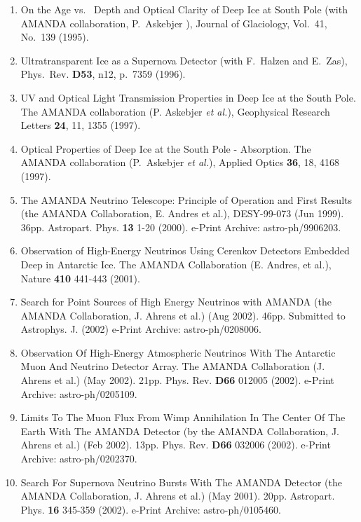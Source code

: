\begin{enumerate}
\item    On the Age vs.~ Depth and Optical Clarity of Deep Ice at 
         South Pole
         (with AMANDA collaboration, P.~Askebjer \etal),
         Journal of Glaciology, Vol.~41, No.~139 (1995).

\item    Ultratransparent Ice as a Supernova Detector
         (with F.~Halzen and E.~Zas), Phys.~Rev. {\bf D53}, n12, p.~7359
         (1996).

\item    UV and Optical Light Transmission Properties in Deep Ice at the
         South Pole.
         The AMANDA collaboration (P. Askebjer {\sl et al.}),
         Geophysical Research Letters {\bf 24}, 11, 1355 (1997).

\item    Optical Properties of Deep Ice at the South Pole - Absorption.
         The AMANDA collaboration (P.~Askebjer {\sl et al.}), 
         Applied Optics {\bf 36}, 18, 4168 (1997).

\item The AMANDA Neutrino Telescope: Principle of Operation and First Results (the AMANDA Collaboration, E. Andres et al.), DESY-99-073 (Jun 1999). 36pp. Astropart. Phys. {\bf 13} 1-20 (2000).  e-Print Archive: astro-ph/9906203.


\item Observation of High-Energy Neutrinos Using Cerenkov Detectors Embedded Deep in Antarctic Ice.  The AMANDA Collaboration (E. Andres, et al.), Nature {\bf 410} 441-443 (2001).

\item Search for Point Sources of High Energy Neutrinos with AMANDA (the AMANDA Collaboration, J. Ahrens et al.) (Aug 2002). 46pp. Submitted to Astrophys. J. (2002) e-Print Archive: astro-ph/0208006.

\item Observation Of High-Energy Atmospheric Neutrinos With The Antarctic Muon And Neutrino Detector Array.  The AMANDA Collaboration (J. Ahrens et al.) (May 2002). 21pp. Phys. Rev. {\bf D66} 012005 (2002).  e-Print Archive: astro-ph/0205109.

\item Limits To The Muon Flux From Wimp Annihilation In The Center Of The Earth With The AMANDA Detector (by the AMANDA Collaboration, J. Ahrens et al.) (Feb 2002). 13pp. Phys. Rev. {\bf D66} 032006 (2002). e-Print Archive: astro-ph/0202370.

\item Search For Supernova Neutrino Bursts With The AMANDA Detector (the AMANDA Collaboration, J. Ahrens et al.) (May 2001). 20pp.  Astropart. Phys. {\bf 16} 345-359 (2002).  e-Print Archive: astro-ph/0105460.


\end{enumerate}
